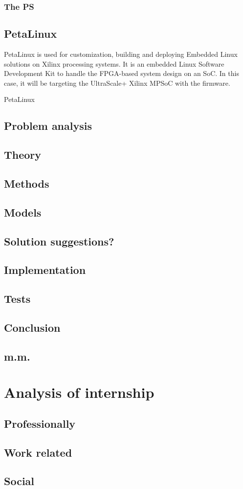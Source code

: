 \subsection{The PS }


\section{PetaLinux}

PetaLinux is used for customization, building and deploying Embedded Linux solutions on Xilinx processing systems. It is an embedded Linux Software Development Kit to handle the FPGA-based system design on an SoC. In this case, it will be targeting the UltraScale+ Xilinx MPSoC with the firmware. 

PetaLinux 



\section{Problem analysis}
\section{Theory}
\section{Methods}
\section{Models}
\section{Solution suggestions?}
\section{Implementation}
\section{Tests}
\section{Conclusion}
\section{m.m.}

\chapter{Analysis of internship}
\section{Professionally}
\section{Work related}
\section{Social}